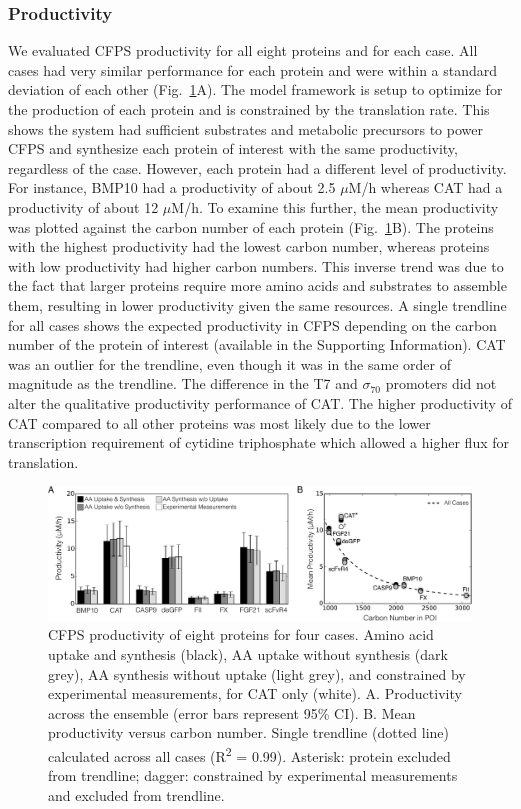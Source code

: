\documentclass[journal=asbcd6,manuscript=article]{achemso}
\begin{document}
\subsubsection{Productivity}
We evaluated CFPS productivity for all eight proteins and for each case.
All cases had very similar performance for each protein and were within a standard deviation of each other (Fig.~\ref{fig:Prod}A).
The model framework is setup to optimize for the production of each protein and is constrained by the translation rate.
This shows the system had sufficient substrates and metabolic precursors to power CFPS and synthesize each protein of interest with the same productivity, regardless of the case.
However, each protein had a different level of productivity.
For instance, BMP10 had a productivity of about 2.5 $\mu$M/h whereas CAT had a productivity of about 12 $\mu$M/h.
To examine this further, the mean productivity was plotted against the carbon number of each protein (Fig.~\ref{fig:Prod}B).
The proteins with the highest productivity had the lowest carbon number, whereas proteins with low productivity had higher carbon numbers.
This inverse trend was due to the fact that larger proteins require more amino acids and substrates to assemble them, resulting in lower productivity given the same resources.
A single trendline for all cases shows the expected productivity in CFPS depending on the carbon number of the protein of interest (available in the Supporting Information).
CAT was an outlier for the trendline, even though it was in the same order of magnitude as the trendline.
The difference in the T7 and  $\sigma_{70}$ promoters did not alter the qualitative productivity performance of CAT.
The higher productivity of CAT compared to all other proteins was most likely due to the lower transcription requirement of cytidine triphosphate which allowed a higher flux for translation.
\begin{figure}[t!]
\centering
\includegraphics[width=1.00\textwidth]{./Figures/Productivity.pdf}
\caption{CFPS productivity of eight proteins for four cases. Amino acid uptake and synthesis (black), AA uptake without synthesis (dark grey), AA synthesis without uptake (light grey), and constrained by experimental measurements, for CAT only (white). A. Productivity across the ensemble (error bars represent 95\% CI). B. Mean productivity versus carbon number. Single trendline (dotted line) calculated across all cases (R\textsuperscript{2} = 0.99). Asterisk: protein excluded from trendline; dagger: constrained by experimental measurements and excluded from trendline.}
\label{fig:Prod}
\end{figure}
\end{document}
